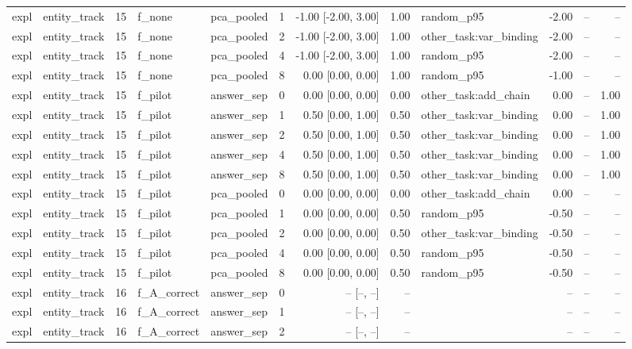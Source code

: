 \begin{tabular}{llrllrrrlrrr}
expl & entity\_track & 15 & f\_none & pca\_pooled & 1 & -1.00 [-2.00, 3.00] & 1.00 & random\_p95 & -2.00 & -- & -- \\
expl & entity\_track & 15 & f\_none & pca\_pooled & 2 & -1.00 [-2.00, 3.00] & 1.00 & other\_task:var\_binding & -2.00 & -- & -- \\
expl & entity\_track & 15 & f\_none & pca\_pooled & 4 & -1.00 [-2.00, 3.00] & 1.00 & random\_p95 & -2.00 & -- & -- \\
expl & entity\_track & 15 & f\_none & pca\_pooled & 8 & 0.00 [0.00, 0.00] & 1.00 & random\_p95 & -1.00 & -- & -- \\
expl & entity\_track & 15 & f\_pilot & answer\_sep & 0 & 0.00 [0.00, 0.00] & 0.00 & other\_task:add\_chain & 0.00 & -- & 1.00 \\
expl & entity\_track & 15 & f\_pilot & answer\_sep & 1 & 0.50 [0.00, 1.00] & 0.50 & other\_task:var\_binding & 0.00 & -- & 1.00 \\
expl & entity\_track & 15 & f\_pilot & answer\_sep & 2 & 0.50 [0.00, 1.00] & 0.50 & other\_task:var\_binding & 0.00 & -- & 1.00 \\
expl & entity\_track & 15 & f\_pilot & answer\_sep & 4 & 0.50 [0.00, 1.00] & 0.50 & other\_task:var\_binding & 0.00 & -- & 1.00 \\
expl & entity\_track & 15 & f\_pilot & answer\_sep & 8 & 0.50 [0.00, 1.00] & 0.50 & other\_task:var\_binding & 0.00 & -- & 1.00 \\
expl & entity\_track & 15 & f\_pilot & pca\_pooled & 0 & 0.00 [0.00, 0.00] & 0.00 & other\_task:add\_chain & 0.00 & -- & -- \\
expl & entity\_track & 15 & f\_pilot & pca\_pooled & 1 & 0.00 [0.00, 0.00] & 0.50 & random\_p95 & -0.50 & -- & -- \\
expl & entity\_track & 15 & f\_pilot & pca\_pooled & 2 & 0.00 [0.00, 0.00] & 0.50 & other\_task:var\_binding & -0.50 & -- & -- \\
expl & entity\_track & 15 & f\_pilot & pca\_pooled & 4 & 0.00 [0.00, 0.00] & 0.50 & random\_p95 & -0.50 & -- & -- \\
expl & entity\_track & 15 & f\_pilot & pca\_pooled & 8 & 0.00 [0.00, 0.00] & 0.50 & random\_p95 & -0.50 & -- & -- \\
expl & entity\_track & 16 & f\_A\_correct & answer\_sep & 0 & -- [--, --] & -- &  & -- & -- & -- \\
expl & entity\_track & 16 & f\_A\_correct & answer\_sep & 1 & -- [--, --] & -- &  & -- & -- & -- \\
expl & entity\_track & 16 & f\_A\_correct & answer\_sep & 2 & -- [--, --] & -- &  & -- & -- & -- \\

\end{tabular}
